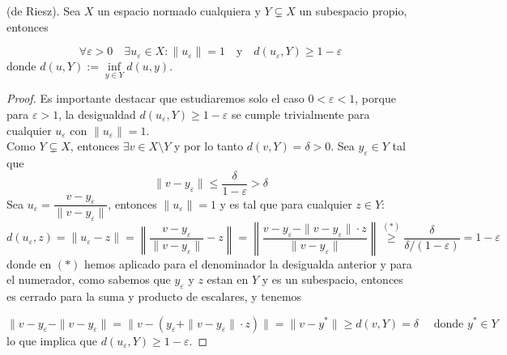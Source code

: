 \begin{lema}(de Riesz).
    Sea $X$ un espacio normado cualquiera y $Y \subsetneq X$ un subespacio propio, entonces

    \begin{equation*}
        \forall \varepsilon > 0 \quad \exists u_\varepsilon \in X : \|u_\varepsilon\| = 1 \quad \text{y} \quad d(u_\varepsilon, Y) \geq 1-\varepsilon
    \end{equation*}
    donde $d(u, Y) := \inf\limits_{y \in Y} d(u, y)$.
\begin{proof}
    Es importante destacar que estudiaremos solo el caso $0<\varepsilon<1$, porque para $\varepsilon >1$, la desigualdad $d(u_\varepsilon, Y) \geq 1-\varepsilon$ se cumple trivialmente para cualquier $u_\varepsilon$ con $\|u_\varepsilon\|=1$. \\

    \noindent
    Como $Y \subsetneq X$, entonces $\exists v \in X \setminus Y$ y por lo tanto $d(v, Y) = \delta > 0$. Sea $y_\varepsilon \in Y$ tal que
    $$\|v - y_\varepsilon\| \leq \frac{\delta}{1 - \varepsilon} > \delta$$
    \noindent
    Sea $u_\varepsilon = \dfrac{v - y_\varepsilon}{\|v - y_\varepsilon\|}$, entonces $\|u_\varepsilon\| = 1$ y es tal que para cualquier $z \in Y$:
    \begin{equation*}
        d(u_\varepsilon, z) = \|u_\varepsilon - z\| = \left\| \frac{v - y_\varepsilon}{\|v - y_\varepsilon\|} - z \right\| = \left\| \frac{v - y_\varepsilon - \|v - y_\varepsilon\| \cdot z}{\|v - y_\varepsilon\|} \right\|  \overset{(*)}{\geq} \frac{\delta}{\delta / (1 - \varepsilon)} = 1 - \varepsilon 
    \end{equation*}
    donde en $(*)$ hemos aplicado para el denominador la desigualda anterior y para el numerador, como sabemos que $y_{\varepsilon}$ y $z$ estan en $Y$ y es un subespacio, entonces es cerrado para la suma y producto de escalares, y tenemos

    \begin{equation*}
        \|v - y_\varepsilon - \|v - y_\varepsilon\|=\|v - (y_\varepsilon + \|v - y_\varepsilon\| \cdot z)\|=\|v-y^*\| \geq d(v, Y) = \delta \quad \text{ donde } y^*\in Y
    \end{equation*}
    lo que implica que $d(u_\varepsilon, Y) \geq 1 - \varepsilon$.
\end{proof}
\end{lema}

